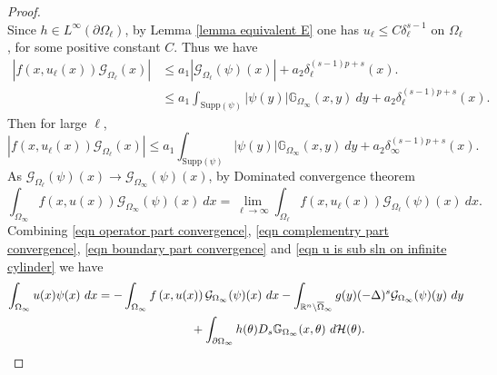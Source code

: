 \documentclass{amsart}
\newcommand{\cred}{\color{red}}
\newcommand{\R}{\mathbb{R}}
\newcommand{\slap}{(-\Delta)^{s}}
\newcommand{\g}[1]{\mathcal{G}_{#1}}
\newcommand{\gk}[1]{\mathbb{G}_{#1}}
\newcommand{\Ds}{D_{s}}
\newcommand{\ul}{u_{\ell}}
\begin{document}
\begin{proof}
\begin{equation*}
 \end{equation*}
 Since $h\in L^{\infty}(\partial\Omega_{\ell})$, by Lemma \ref{lemma equivalent E} one has $u_{\ell}\leq C \delta_{\ell}^{s-1}$ on $\Omega_{\ell}$, for some positive constant $C$. Thus we have 
\begin{equation*}
\begin{split}
    |f\left(x,u_{\ell}(x)\right)\g{\Omega_{\ell}}(x)|&\leq a_{1}|\g{\Omega_{\ell}}(\psi)(x)|+a_{2}\delta_{\ell}^{(s-1)p+s}(x).\\
     &\leq a_{1}\int_{\text{Supp}(\psi)}|\psi(y)|\gk{\Omega_{\infty}}(x,y)\ dy+a_{2}\delta_{\ell}^{(s-1)p+s}(x).
     \end{split}
 \end{equation*}
Then for large $\ell$,
\begin{equation*}
    |f\left(x,u_{\ell}(x)\right)\g{\Omega_{\ell}}(x)|\leq a_{1}\int_{\text{Supp}(\psi)}|\psi(y)|\gk{\Omega_{\infty}}(x,y)\ dy+a_{2}\delta_{\infty}^{(s-1)p+s}(x).
\end{equation*}
 As $\g{\Omega_{\ell}}(\psi)(x)\to \g{\Omega_{\infty}}(\psi)(x)$, by Dominated convergence theorem 
 \begin{equation}\label{eqn u is sub sln on infinite cylinder}
     \int_{\Omega_{\infty}} f\left(x,u(x)\right) \g{\Omega_{\infty}}(\psi)(x)\ dx = \lim_{\ell\to\infty}\int_{\Omega_{\ell}}f\left(x,\ul(x)\right) \g{\Omega_{\ell}}(\psi)(x)\ dx.
 \end{equation}
 Combining \eqref{eqn operator part convergence}, \eqref{eqn complementry part convergence}, \eqref{eqn boundary part convergence} and \eqref{eqn u is sub sln on infinite cylinder} we have
\begin{equation*}
\begin{split}
    \int_{\Omega_{\infty}}u(x)\psi(x)\ dx=-&\int_{\Omega_{\infty}}f\left(x,u(x)\right)\g{\Omega_{\infty}}(\psi)(x)\ dx-\int_{\R^{n}\setminus\overline{\Omega}_{\infty}}g(y)\slap\g{\Omega_{\infty}}(\psi)(y)\ dy\\
    &\hspace{2cm}+\int_{\partial\Omega_{\infty}}h(\theta) \Ds\gk{\Omega_{\infty}}(x,\theta)\ d\mathcal{H}(\theta).\qedhere
    \end{split}
\end{equation*}
\end{proof}
\end{document}
